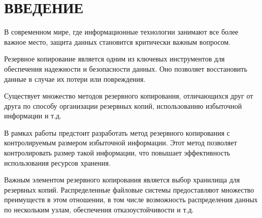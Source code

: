 \chapter*{ВВЕДЕНИЕ}

В современном мире, где информационные технологии занимают все более важное место, защита данных становится критически важным вопросом. 

Резервное копирование является одним из ключевых инструментов для обеспечения надежности и безопасности данных. Оно позволяет восстановить данные в случае их потери или повреждения.

Существует множество методов резервного копирования, отличающихся друг от друга по способу организации резервных копий, использованию избыточной информации и т.д. 

В рамках работы предстоит разработать метод резервного копирования с контролируемым размером избыточной информации. Этот метод позволяет контролировать размер такой информации, что повышает эффективность использования ресурсов хранения.

Важным элементом резервного копирования является выбор хранилища для резервных копий. Распределенные файловые системы предоставляют множество преимуществ в этом отношении, в том числе возможность распределения данных по нескольким узлам, обеспечения отказоустойчивости и т.д.

